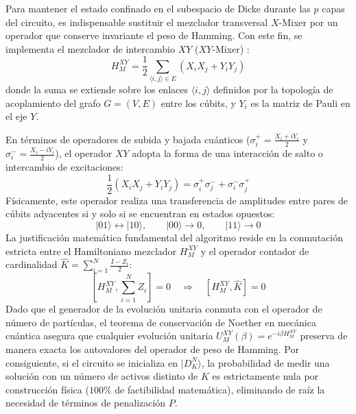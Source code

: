 Para mantener el estado confinado en el subespacio de Dicke durante las $p$ capas del circuito, es indispensable sustituir el mezclador transversal $X$-Mixer por un operador que conserve invariante el peso de Hamming. Con este fin, se implementa el mezclador de intercambio $XY$ ($XY$-Mixer) \cite{Barkoutsos2020}:
\begin{equation}
    H_{M}^{XY} = \frac{1}{2} \sum_{\langle i,j \rangle \in E} \left( X_i X_j + Y_i Y_j \right)
    \label{eq:mezclador_xy}
\end{equation}
donde la suma se extiende sobre los enlaces $\langle i,j \rangle$ definidos por la topología de acoplamiento del grafo $G=(V,E)$ entre los cúbits, y $Y_i$ es la matriz de Pauli en el eje $Y$.

En términos de operadores de subida y bajada cuánticos ($\sigma_i^+ = \frac{X_i + iY_i}{2}$ y $\sigma_i^- = \frac{X_i - iY_i}{2}$), el operador $XY$ adopta la forma de una interacción de salto o intercambio de excitaciones:
\begin{equation}
    \frac{1}{2} (X_i X_j + Y_i Y_j) = \sigma_i^+ \sigma_j^- + \sigma_i^- \sigma_j^+
\end{equation}
Físicamente, este operador realiza una transferencia de amplitudes entre pares de cúbits adyacentes si y solo si se encuentran en estados opuestos:
\begin{equation}
    |01\rangle \longleftrightarrow |10\rangle, \qquad |00\rangle \longrightarrow 0, \qquad |11\rangle \longrightarrow 0
\end{equation}
La justificación matemática fundamental del algoritmo reside en la conmutación estricta entre el Hamiltoniano mezclador $H_M^{XY}$ y el operador contador de cardinalidad $\hat{K} = \sum_{i=1}^N \frac{I - Z_i}{2}$:
\begin{equation}
    \left[ H_{M}^{XY}, \sum_{i=1}^N Z_i \right] = 0 \quad \Longrightarrow \quad \left[ H_{M}^{XY}, \hat{K} \right] = 0
    \label{eq:conmutador_xy}
\end{equation}
Dado que el generador de la evolución unitaria conmuta con el operador de número de partículas, el teorema de conservación de Noether en mecánica cuántica asegura que cualquier evolución unitaria $U_M^{XY}(\beta) = e^{-i \beta H_M^{XY}}$ preserva de manera exacta los autovalores del operador de peso de Hamming. Por consiguiente, si el circuito se inicializa en $|D_K^N\rangle$, la probabilidad de medir una solución con un número de activos distinto de $K$ es estrictamente nula por construcción física ($100\%$ de factibilidad matemática), eliminando de raíz la necesidad de términos de penalización $P$.

